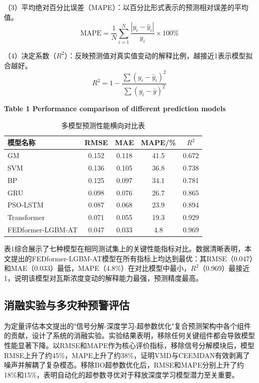 \documentclass[twocolumn,a4paper]{ctexart}
\numberwithin{equation}{section}
\begin{document}
（3）平均绝对百分比误差（MAPE）：以百分比形式表示的预测相对误差的平均值。
\begin{equation}
\text{MAPE} = \frac{1}{N} \sum_{i=1}^{N} \frac{|y_i - \hat{y}_i|}{y_i} \times 100\%
\end{equation}

（4）决定系数（$R^2$）：反映预测值对真实值变动的解释比例，越接近1表示模型拟合越好。
\begin{equation}
R^2 = 1 - \frac{\sum(y_i - \hat{y}_i)^2}{\sum(y_i - \bar{y})^2}
\end{equation}

\begin{table}[htbp]
\centering
{}
\caption{多模型预测性能横向对比表}\label{tab:performance}
\vspace{0.5\baselineskip}
\textbf{Table 1 Performance comparison of different prediction models}
\vspace{0.5\baselineskip}
\begin{tabular}{lcccc}
\toprule
模型名称 & RMSE & MAE & MAPE/\% & $R^2$ \\
\midrule
GM & 0.152 & 0.118 & 41.5 & 0.672 \\
SVM & 0.136 & 0.105 & 36.8 & 0.738 \\
BP & 0.125 & 0.097 & 34.1 & 0.781 \\
GRU & 0.098 & 0.076 & 26.7 & 0.865 \\
PSO-LSTM & 0.087 & 0.068 & 23.9 & 0.894 \\
Transformer & 0.071 & 0.055 & 19.3 & 0.929 \\
FEDformer-LGBM-AT & 0.047 & 0.033 & 4.8 & 0.969 \\
\bottomrule
\end{tabular}
\end{table}

表1综合展示了七种模型在相同测试集上的关键性能指标对比。数据清晰表明，本文提出的FEDformer-LGBM-AT模型在所有指标上均达到最优：其RMSE（0.047）和MAE（0.033）最低，MAPE（4.8\%）在对比模型中最小，$R^2$（0.969）最接近1，说明该模型对瓦斯浓度变动的解释能力最强，预测精度最高。

\subsection{消融实验与多灾种预警评估}

为定量评估本文提出的"信号分解-深度学习-超参数优化"复合预测架构中各个组件的贡献，设计了系统的消融实验。实验结果表明，移除任何关键组件都会导致模型性能显著下降。以RMSE和MAPE作为核心评价指标，移除信号分解模块后，模型RMSE上升了约45\%，MAPE上升了约38\%，证明VMD与CEEMDAN有效剥离了噪声并解耦了复杂模态。移除BO超参数优化后，RMSE和MAPE分别上升了约18\%和15\%，表明自动化的超参数寻优对于释放深度学习模型潜力至关重要。
\end{document}
